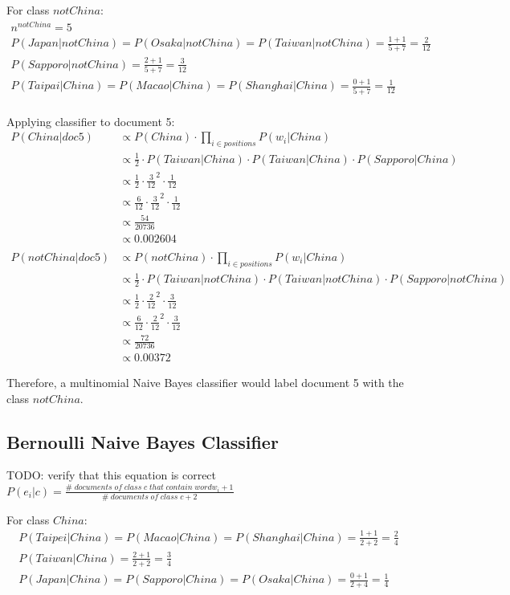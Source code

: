 \documentclass{article}
\begin{document}
For class $notChina$:
\begin{align}
n^{notChina} = 5 \\
P(Japan|notChina) = P(Osaka|notChina) = P(Taiwan|notChina) = \frac{1 + 1}{5 + 7} = \frac{2}{12} \\
P(Sapporo|notChina) = \frac{2 + 1}{5 + 7} = \frac{3}{12} \\
P(Taipai|China) = P(Macao|China) = P(Shanghai|China) = \frac{0 + 1}{5 + 7} = \frac{1}{12} \\
\end{align}

Applying classifier to document 5:
\begin{align}
	P(China|doc5) & \propto P(China) \cdot \prod_{i \in positions} {P(w_i|China)} \\
	& \propto \frac{1}{2} \cdot P(Taiwan|China) \cdot P(Taiwan|China) \cdot P(Sapporo|China) \\
	& \propto \frac{1}{2} \cdot \frac{3}{12}^2 \cdot \frac{1}{12} \\
	& \propto \frac{6}{12} \cdot \frac{3}{12}^2 \cdot \frac{1}{12} \\
	& \propto \frac{54}{20736} \\
	& \propto 0.002604 \\
	& \nonumber \\ 
	P(notChina|doc5) & \propto P(notChina) \cdot \prod_{i \in positions} {P(w_i|China)} \\
	& \propto \frac{1}{2} \cdot P(Taiwan|notChina) \cdot P(Taiwan|notChina) \cdot P(Sapporo|notChina) \\
	& \propto \frac{1}{2} \cdot \frac{2}{12}^2 \cdot \frac{3}{12} \\
	& \propto \frac{6}{12} \cdot \frac{2}{12}^2 \cdot \frac{3}{12} \\	
	& \propto \frac{72}{20736} \\
	& \propto 0.00372
\end{align}

Therefore, a multinomial Naive Bayes classifier would label document 5 with the class $notChina$.

\subsection{Bernoulli Naive Bayes Classifier}

TODO: verify that this equation is correct
$P(e_i|c) = \frac{\#\;documents\;of\;class\;c\;that\;contain\;word w_i + 1}{\#\;documents\;of\;class\;c + 2}$

For class $China$:
\begin{align}
P(Taipei|China) = P(Macao|China) = P(Shanghai|China) = \frac{1 + 1}{2 + 2} = \frac{2}{4} \\
P(Taiwan|China) = \frac{2 + 1}{2 + 2} = \frac{3}{4} \\
P(Japan|China) = P(Sapporo|China) = P(Osaka|China) = \frac{0 + 1}{2 + 4} = \frac{1}{4}
\end{align}
\end{document}
